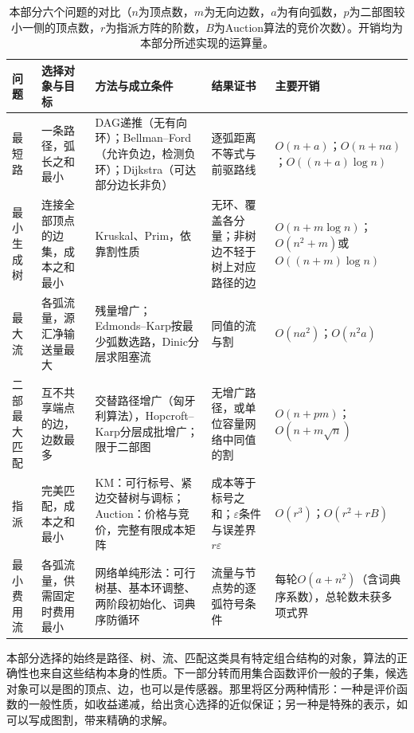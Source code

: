 \begin{table}[!htb]
  \centering\small
  \begin{tabularx}{\linewidth}{@{}l>{\raggedright\arraybackslash}X>{\raggedright\arraybackslash}X>{\raggedright\arraybackslash}X>{\raggedright\arraybackslash}p{30mm}@{}}
    \toprule
    问题 & 选择对象与目标 & 方法与成立条件 & 结果证书 & 主要开销\\
    \midrule
    最短路 & 一条路径，弧长之和最小 & DAG递推（无有向环）；Bellman--Ford（允许负边，检测负环）；Dijkstra（可达部分边长非负） & 逐弧距离不等式与前驱路线 & $O(n+a)$；$O(n+na)$；$O((n+a)\log n)$\\
    最小生成树 & 连接全部顶点的边集，成本之和最小 & Kruskal、Prim，依靠割性质 & 无环、覆盖各分量；非树边不轻于树上对应路径的边 & $O(n+m\log n)$；$O(n^2+m)$或$O((n+m)\log n)$\\
    最大流 & 各弧流量，源汇净输送量最大 & 残量增广；Edmonds--Karp按最少弧数选路，Dinic分层求阻塞流 & 同值的流与割 & $O(na^2)$；$O(n^2a)$\\
    二部最大匹配 & 互不共享端点的边，边数最多 & 交替路径增广（匈牙利算法），Hopcroft--Karp分层成批增广；限于二部图 & 无增广路径，或单位容量网络中同值的割 & $O(n+pm)$；$O(n+m\sqrt n)$\\
    指派 & 完美匹配，成本之和最小 & KM：可行标号、紧边交替树与调标；Auction：价格与竞价，完整有限成本矩阵 & 成本等于标号之和；$\varepsilon$条件与误差界$r\varepsilon$ & $O(r^3)$；$O(r^2+rB)$\\
    最小费用流 & 各弧流量，供需固定时费用最小 & 网络单纯形法：可行树基、基本环调整、两阶段初始化、词典序防循环 & 流量与节点势的逐弧符号条件 & 每轮$O(a+n^2)$（含词典序系数），总轮数未获多项式界\\
    \bottomrule
  \end{tabularx}
  \caption{本部分六个问题的对比（$n$为顶点数，$m$为无向边数，$a$为有向弧数，$p$为二部图较小一侧的顶点数，$r$为指派方阵的阶数，$B$为Auction算法的竞价次数）。开销均为本部分所述实现的运算量。}
  \label{tab:graph-opt-summary}
\end{table}

本部分选择的始终是路径、树、流、匹配这类具有特定组合结构的对象，算法的正确性也来自这些结构本身的性质。下一部分转而用集合函数评价一般的子集，候选对象可以是图的顶点、边，也可以是传感器。那里将区分两种情形：一种是评价函数的一般性质，如收益递减，给出贪心选择的近似保证；另一种是特殊的表示，如可以写成图割，带来精确的求解。
